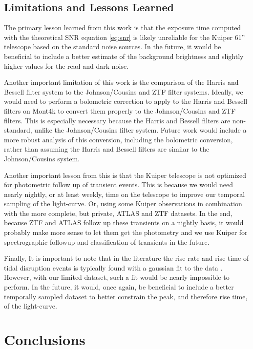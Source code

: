 \documentclass{aastex631}
\begin{document}
\subsection{Limitations and Lessons Learned}

The primary lesson learned from this work is that the exposure time computed with the theoretical SNR equation \ref{eq:snr} is likely unreliable for the Kuiper 61'' telescope based on the standard noise sources. In the future, it would be beneficial to include a better estimate of the background brightness and slightly higher values for the read and dark noise.

Another important limitation of this work is the comparison of the Harris and Bessell filter system to the Johnson/Cousins and ZTF filter systems. Ideally, we would need to perform a bolometric correction to apply to the Harris and Bessell filters on Mont4k to convert them properly to the Johnson/Cousins and ZTF filters. This is especially necessary because the Harris and Bessell filters are non-standard, unlike the Johnson/Cousins filter system. Future work would include a more robust analysis of this conversion, including the bolometric conversion, rather than assuming the Harris and Bessell filters are similar to the Johnson/Cousins system. 

Another important lesson from this is that the Kuiper telescope is not optimized for photometric follow up of transient events. This is because we would need nearly nightly, or at least weekly, time on the telescope to improve our temporal sampling of the light-curve. Or, using some Kuiper observations in combination with the more complete, but private, ATLAS and ZTF datasets. In the end, because ZTF and ATLAS follow up these transients on a nightly basis, it would probably make more sense to let them get the photometry and we use Kuiper for spectrographic followup and classification of transients in the future.   

Finally, It is important to note that in the literature the rise rate and rise time of tidal disruption events is typically found with a gaussian fit to the data \citep{gezari2021, vanVelzen2021}. However, with our limited dataset, such a fit would be nearly impossible to perform. In the future, it would, once again, be beneficial to include a better temporally sampled dataset to better constrain the peak, and therefore rise time, of the light-curve. 

\section{Conclusions}\label{sec:conclusion}
\end{document}
